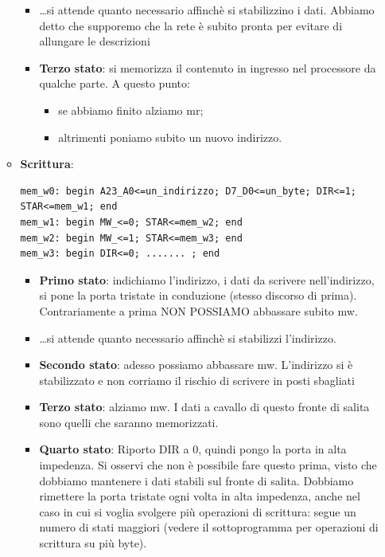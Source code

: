 \documentclass[11pt]{report}
\begin{document}
\begin{itemize}
\begin{itemize}
\begin{itemize}
\item \dots si attende quanto necessario affinchè si stabilizzino i dati. Abbiamo detto che supporemo che la rete è subito pronta per evitare di allungare le descrizioni
\item \textbf{Terzo stato}: si memorizza il contenuto in ingresso nel processore da qualche parte. A questo punto:
\begin{itemize}
\item se abbiamo finito alziamo mr;
\item altrimenti poniamo subito un nuovo indirizzo.
\end{itemize}
\end{itemize}
\item \textbf{Scrittura}:
\begin{verbatim}
mem_w0: begin A23_A0<=un_indirizzo; D7_D0<=un_byte; DIR<=1;
STAR<=mem_w1; end
mem_w1: begin MW_<=0; STAR<=mem_w2; end
mem_w2: begin MW_<=1; STAR<=mem_w3; end
mem_w3: begin DIR<=0; ....... ; end
\end{verbatim}
\begin{itemize}
\item \textbf{Primo stato}: indichiamo l'indirizzo, i dati da scrivere nell'indirizzo, si pone la porta tristate in conduzione (stesso discorso di prima). Contrariamente a prima NON POSSIAMO abbassare subito mw.
\item \dots si attende quanto necessario affinchè si stabilizzi l'indirizzo.
\item \textbf{Secondo stato}: adesso possiamo abbassare mw. L'indirizzo si è stabilizzato e non corriamo il rischio di scrivere in posti sbagliati
\item \textbf{Terzo stato}: alziamo mw. I dati a cavallo di questo fronte di salita sono quelli che saranno memorizzati.
\item \textbf{Quarto stato}: Riporto DIR a 0, quindi pongo la porta in alta impedenza. Si osservi che non è possibile fare questo prima, visto che dobbiamo mantenere i dati stabili sul fronte di salita. Dobbiamo rimettere la porta tristate ogni volta in alta impedenza, anche nel caso in cui si voglia svolgere più operazioni di scrittura: segue un numero di stati maggiori (vedere il sottoprogramma per operazioni di scrittura su più byte).
\end{itemize}
\end{itemize}
\end{itemize}
\end{document}
